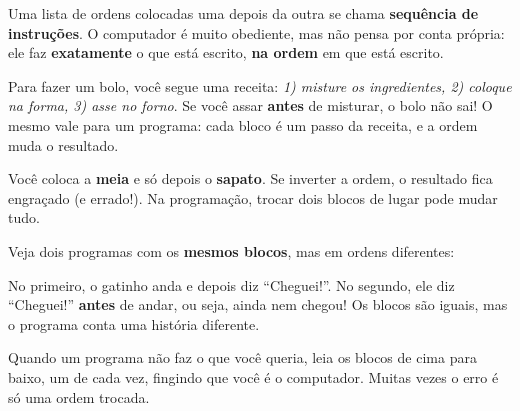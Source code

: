 Uma lista de ordens colocadas uma depois da outra se chama \textbf{sequência de instruções}. O computador é muito obediente, mas não pensa por conta própria: ele faz \textbf{exatamente} o que está escrito, \textbf{na ordem} em que está escrito.

\begin{pensaassim}
Para fazer um bolo, você segue uma receita: \emph{1) misture os ingredientes, 2) coloque na forma, 3) asse no forno}. Se você assar \textbf{antes} de misturar, o bolo não sai! O mesmo vale para um programa: cada bloco é um passo da receita, e a ordem muda o resultado.
\end{pensaassim}

\begin{pensaassim}
Você coloca a \textbf{meia} e só depois o \textbf{sapato}. Se inverter a ordem, o resultado fica engraçado (e errado!). Na programação, trocar dois blocos de lugar pode mudar tudo.
\end{pensaassim}

Veja dois programas com os \textbf{mesmos blocos}, mas em ordens diferentes:

\begin{codigo}
\begin{pilha}
\end{pilha}
\end{codigo}

\begin{codigo}
\begin{pilha}
\end{pilha}
\end{codigo}

No primeiro, o gatinho anda e depois diz ``Cheguei!''. No segundo, ele diz ``Cheguei!'' \textbf{antes} de andar, ou seja, ainda nem chegou! Os blocos são iguais, mas o programa conta uma história diferente.

\begin{dica}
Quando um programa não faz o que você queria, leia os blocos de cima para baixo, um de cada vez, fingindo que você é o computador. Muitas vezes o erro é só uma ordem trocada.
\end{dica}

